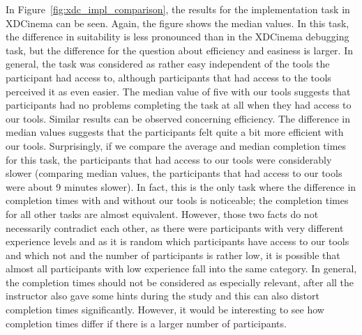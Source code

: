In Figure~\ref{fig:xdc_impl_comparison}, the results for the implementation task in XDCinema can be seen. Again, the figure shows the median values. In this task, the difference in suitability is less pronounced than in the XDCinema debugging task, but the difference for the question about efficiency and easiness is larger. In general, the task was considered as rather easy independent of the tools the participant had access to, although participants that had access to the tools perceived it as even easier. The median value of five with our tools suggests that participants had no problems completing the task at all when they had access to our tools. Similar results can be observed concerning efficiency. The difference in median values suggests that the participants felt quite a bit more efficient with our tools. Surprisingly, if we compare the average and median completion times for this task, the participants that had access to our tools were considerably slower (comparing median values, the participants that had access to our tools were about 9 minutes slower). In fact, this is the only task where the difference in completion times with and without our tools is noticeable; the completion times for all other tasks are almost equivalent. However, those two facts do not necessarily contradict each other, as there were participants with very different experience levels and as it is random which participants have access to our tools and which not and the number of participants is rather low, it is possible that almost all participants with low experience fall into the same category. In general, the completion times should not be considered as especially relevant, after all the instructor also gave some hints during the study and this can also distort completion times significantly. However, it would be interesting to see how completion times differ if there is a larger number of participants. 

